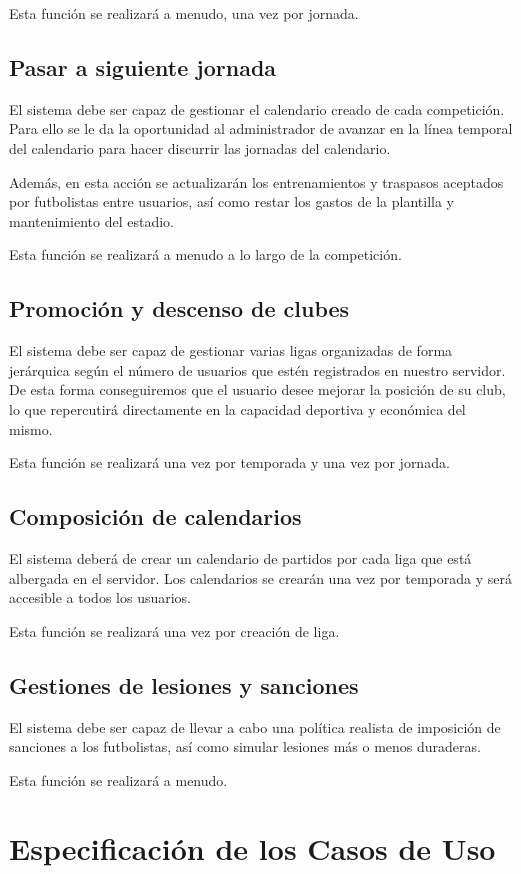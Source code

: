 Esta función se realizará a menudo, una vez por jornada.

\subsection{Pasar a siguiente jornada}
El sistema debe ser capaz de gestionar el calendario creado de cada
competición. Para ello se le da la oportunidad al administrador de avanzar en la
línea temporal del calendario para hacer discurrir las jornadas del calendario.

Además, en esta acción se actualizarán los entrenamientos y traspasos aceptados
por futbolistas entre usuarios, así como restar los gastos de la plantilla y
mantenimiento del estadio.

Esta función se realizará a menudo a lo largo de la competición.

\subsection{Promoción y descenso de clubes}
El sistema debe ser capaz de gestionar varias ligas organizadas de forma
jerárquica según el número de usuarios que estén registrados en nuestro
servidor. De esta forma conseguiremos que el usuario desee mejorar la posición
de su club, lo que repercutirá directamente en la capacidad deportiva y
económica del mismo.

Esta función se realizará una vez por temporada y una vez por jornada.

\subsection{Composición de calendarios}
El sistema deberá de crear un calendario de partidos por cada liga que está
albergada en el servidor. Los calendarios se crearán una vez por temporada y
será accesible a todos los usuarios.

Esta función se realizará una vez por creación de liga.
\subsection{Gestiones de lesiones y sanciones}
El sistema debe ser capaz de llevar a cabo una política realista de imposición
de sanciones a los futbolistas, así como simular lesiones más o menos duraderas.

Esta función se realizará a menudo.

\section{Especificación de los Casos de Uso}
